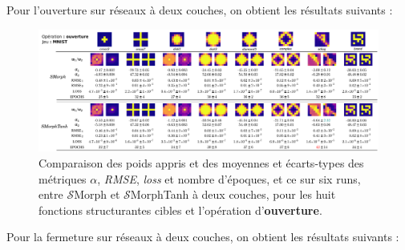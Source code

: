 \vspace{1.5mm}
Pour l'ouverture sur réseaux à deux couches, on obtient les résultats suivants : \\

\vspace{2.0mm}
\begin{figure}[ht]
  \begin{center}
    \includegraphics[width=1.00\textwidth]{parts/3-contributions/A-reseaux_smorphTANH/figures/t_opening_mnist.pdf}
    \vspace{-2.0mm}
    \caption{ \centering Comparaison des poids appris et des moyennes et écarts-types des métriques $\alpha$, \textit{RMSE}, \textit{loss} et nombre d'époques, et ce sur six runs, entre $\mathcal{S}$Morph et $\mathcal{S}$MorphTanh à deux couches, pour les huit fonctions structurantes cibles et l'opération d'\textbf{ouverture}.}
    \label{fig:SMvsSMTH_opening_mnist}
  \end{center}
\end{figure}


\newpage

Pour la fermeture sur réseaux à deux couches, on obtient les résultats suivants : \\

